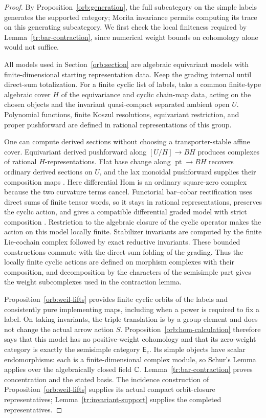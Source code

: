 \begin{proof}
By Proposition~\ref{orb:generation}, the full subcategory on the simple
labels generates the supported category; Morita invariance permits
computing its trace on this generating subcategory.  We first check
the local finiteness required by Lemma~\ref{tr:bar-contraction}, since
numerical weight bounds on cohomology alone would not suffice.

All models used in Section~\ref{orb:section} are algebraic equivariant
models with finite-dimensional starting representation data.  Keep
the grading internal until direct-sum totalization.  For a finite
cyclic list of labels, take a common finite-type algebraic cover $H$
of the equivariance and cyclic chain-map data, acting on the chosen
objects and the invariant quasi-compact
separated ambient open $U$.  Polynomial functions, finite Koszul
resolutions, equivariant restriction, and proper pushforward are
defined in rational representations of this group.

One can compute derived sections without choosing a
transporter-stable affine cover.  Equivariant derived pushforward
along $[U/H]\to BH$ produces complexes of rational
$H$-representations.  Flat base change along $\operatorname{pt}\to BH$
recovers ordinary derived sections on $U$, and the lax monoidal
pushforward supplies their composition maps
\cite[\S1.3.10, Corollary~1.4.5, and \S\S6.4.3--6.4.6]{DGFiniteness}.
Here differential Hom is an ordinary square-zero complex because
the two curvature terms cancel.  Functorial bar--cobar rectification
uses direct sums of finite tensor words, so it stays in rational
representations, preserves the cyclic action, and gives a compatible
differential graded model with strict composition
\cite[Proposition~2.1 and \S\S4.3, 4.8, 5.2]{KellerAInfinity}.
Restriction to the algebraic closure of the cyclic operator makes
the action on this model locally finite.  Stabilizer invariants are
computed by the finite Lie-cochain complex followed by exact
reductive invariants.  These bounded constructions commute with the
direct-sum folding of the grading.  Thus the locally finite cyclic
actions are defined on morphism complexes with their composition,
and decomposition by the characters of the semisimple part gives
the weight subcomplexes used in the contraction lemma.

Proposition~\ref{orb:weil-lifts} provides finite cyclic orbits of the
labels and consistently pure implementing maps, including when a
power is required to fix a label.  On taking invariants, the
triple translation is by a group element and does not change the
actual arrow action $S$.  Proposition~\ref{orb:hom-calculation}
therefore says that this model has no positive-weight cohomology and
that its zero-weight category is exactly the semisimple category
$\mathsf E_e$.  Its simple objects have scalar endomorphisms: each is
a finite-dimensional complex module, so Schur's Lemma applies over
the algebraically closed field $\mathbb C$.
Lemma~\ref{tr:bar-contraction} proves concentration
and the stated basis.  The incidence construction of
Proposition~\ref{orb:weil-lifts} supplies its actual compact
orbit-closure representatives; Lemma~\ref{tr:invariant-support}
supplies the completed representatives.


\end{proof}
